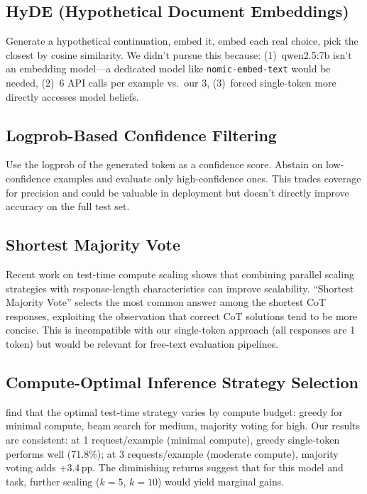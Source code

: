 \documentclass[11pt]{article}
\begin{document}
\subsection{HyDE (Hypothetical Document Embeddings)}

Generate a hypothetical continuation, embed it, embed each real choice, pick the closest by cosine similarity. We didn't pursue this because: (1)~qwen2.5:7b isn't an embedding model---a dedicated model like \texttt{nomic-embed-text} would be needed, (2)~6 API calls per example vs.\ our 3, (3)~forced single-token more directly accesses model beliefs.

\subsection{Logprob-Based Confidence Filtering}

Use the logprob of the generated token as a confidence score. Abstain on low-confidence examples and evaluate only high-confidence ones. This trades coverage for precision and could be valuable in deployment but doesn't directly improve accuracy on the full test set.

\subsection{Shortest Majority Vote}

Recent work on test-time compute scaling \citep{snell2024} shows that combining parallel scaling strategies with response-length characteristics can improve scalability. ``Shortest Majority Vote'' selects the most common answer among the shortest CoT responses, exploiting the observation that correct CoT solutions tend to be more concise. This is incompatible with our single-token approach (all responses are 1 token) but would be relevant for free-text evaluation pipelines.

\subsection{Compute-Optimal Inference Strategy Selection}

\citet{brown2024} find that the optimal test-time strategy varies by compute budget: greedy for minimal compute, beam search for medium, majority voting for high. Our results are consistent: at 1 request/example (minimal compute), greedy single-token performs well (71.8\%); at 3 requests/example (moderate compute), majority voting adds +3.4\,pp. The diminishing returns suggest that for this model and task, further scaling ($k{=}5$, $k{=}10$) would yield marginal gains.
\end{document}

